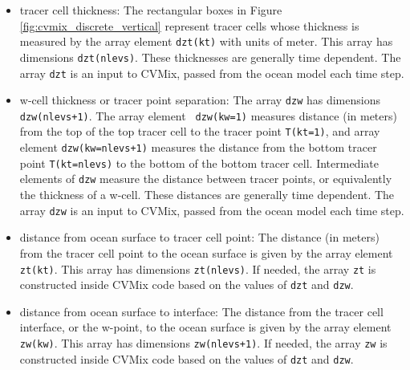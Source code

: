 \begin{itemize}
 
\item {\sc tracer cell thickness}: The rectangular boxes in Figure
  \ref{fig:cvmix_discrete_vertical} represent tracer cells whose
  thickness is measured by the array element {\tt dzt(kt)} with units
  of meter. This array has dimensions {\tt dzt(nlevs)}.  These
  thicknesses are generally time dependent.  The array {\tt dzt} is an
  input to CVMix, passed from the ocean model each time step.

\item {\sc w-cell thickness or tracer point separation}: The array
  {\tt dzw} has dimensions {\tt dzw(nlevs+1)}.  The array element {\tt
    dzw(kw=1)} measures distance (in meters) from the top of the top
  tracer cell to the tracer point {\tt T(kt=1)}, and array element
  {\tt dzw(kw=nlevs+1)} measures the distance from the bottom tracer
  point {\tt T(kt=nlevs)} to the bottom of the bottom tracer cell.
  Intermediate elements of {\tt dzw} measure the distance between
  tracer points, or equivalently the thickness of a w-cell.  These
  distances are generally time dependent.  The array {\tt dzw} is an
  input to CVMix, passed from the ocean model each time step.

\item {\sc distance from ocean surface to tracer cell point}: The
  distance (in meters) from the tracer cell point to the ocean surface
  is given by the array element {\tt zt(kt)}.  This array has
  dimensions {\tt zt(nlevs)}.  If needed, the array {\tt zt} is
  constructed inside CVMix code based on the values of {\tt dzt} and
  {\tt dzw}. 

\item {\sc distance from ocean surface to interface}: The distance
  from the tracer cell interface, or the w-point, to the ocean surface
  is given by the array element {\tt zw(kw)}.  This array has
  dimensions {\tt zw(nlevs+1)}.  If needed, the array {\tt zw} is
  constructed inside CVMix code based on the values of {\tt dzt} and
  {\tt dzw}.

\end{itemize}



